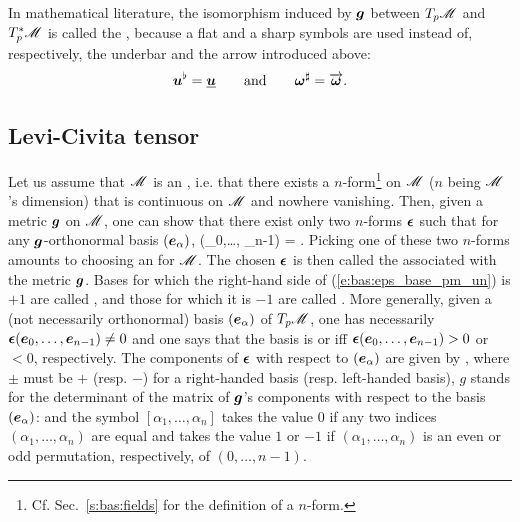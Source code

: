\begin{remark}
In mathematical literature, the isomorphism induced by $\bm{g}$ between
${T_p\mathscr{M}}$ and ${T_p^*\mathscr{M}}$ is called the ,
because a flat and a sharp symbols are used instead of,
respectively, the underbar and the arrow introduced above:
\[
  \bm{u}^\flat = \underline{\bm{u}} \qquad\mbox{and}\qquad \bm{\omega}^\sharp = \overrightarrow{\bm{\bm{\omega}}} .
\]
\end{remark}


\subsection{Levi-Civita tensor} \label{s:bas:Levi-Civita_tensor}

Let us assume that $\mathscr{M}$ is an , i.e. that there exists a $n$-form\footnote{Cf. Sec.~\ref{s:bas:fields} for the definition of a $n$-form.} on $\mathscr{M}$ ($n$ being
$\mathscr{M}$'s dimension) that is continuous on $\mathscr{M}$ and nowhere vanishing.
Then, given a metric $\bm{g}$ on $\mathscr{M}$, one can show that there exist only two
$n$-forms $\bm{\epsilon}$ such that for any $\bm{g}$-orthonormal basis $(\bm{e}_\alpha)$,
\be \label{e:bas:eps_base_pm_un}
  \w{\epsilon}(_0,\ldots, _{n-1}) =  .
\ee
Picking one of these two $n$-forms amounts to choosing an
 for $\mathscr{M}$. The chosen $\bm{\epsilon}$
is then called the  associated with
the metric $\bm{g}$.
Bases for which the right-hand side of (\ref{e:bas:eps_base_pm_un})
is $+1$ are called , and those for which it is $-1$ are called
.
More generally, given a (not necessarily orthonormal) basis $(\bm{e}_\alpha)$ of $T_p\mathscr{M}$,
one has necessarily $\bm{\epsilon}(\bm{e}_0,\ldots, \bm{e}_{n-1}) \not =0$
and one says that the basis is 
or 
iff $\bm{\epsilon}(\bm{e}_0,\ldots, \bm{e}_{n-1}) > 0$ or $<0$, respectively.
The components of $\bm{\epsilon}$ with
respect to $(\bm{e}_\alpha)$ are given by
\be \label{e:bas:eps_sqrt_g}
  ,
\ee
where $\pm$ must be $+$ (resp. $-$) for a right-handed basis (resp. left-handed basis),
$g$ stands for the determinant of the matrix of $\bm{g}$'s components with respect
to the basis $(\bm{e}_\alpha)$:
\be \label{e:bas:def_det_g}
\ee
and the symbol $[\alpha_1, \ldots, \alpha_n]$ takes the value $0$ if any two indices
$(\alpha_1, \ldots, \alpha_n)$ are equal and takes the value $1$ or $-1$ if
$(\alpha_1, \ldots, \alpha_n)$ is an even or odd permutation, respectively, of
$(0,\ldots,n-1)$.

